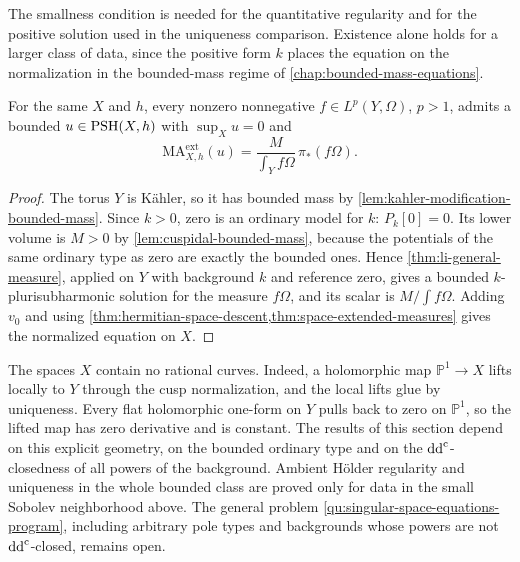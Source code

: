 The smallness condition is needed for the quantitative regularity and for the positive solution used in the uniqueness comparison. Existence alone holds for a larger class of data, since the positive form $k$ places the equation on the normalization in the bounded-mass regime of \cref{chap:bounded-mass-equations}.

\begin{corollary}\label{cor:cuspidal-lp-bounded-existence}
For the same $X$ and $h$, every nonzero nonnegative $f\in L^p(Y,\Omega)$, $p>1$, admits a bounded $u\in\mathrm{PSH}(X,h)$ with $\sup_Xu=0$ and
\[
 \mathrm{MA}^{\mathrm{ext}}_{X,h}(u)=\frac{M}{\int_Yf\Omega}\,\pi_*(f\Omega).
\]
\end{corollary}
\begin{proof}
The torus $Y$ is K\"ahler, so it has bounded mass by \cref{lem:kahler-modification-bounded-mass}. Since $k>0$, zero is an ordinary model for $k$: $P_k[0]=0$. Its lower volume is $M>0$ by \cref{lem:cuspidal-bounded-mass}, because the potentials of the same ordinary type as zero are exactly the bounded ones. Hence \cref{thm:li-general-measure}, applied on $Y$ with background $k$ and reference zero, gives a bounded $k$-plurisubharmonic solution for the measure $f\Omega$, and its scalar is $M/\int f\Omega$. Adding $v_0$ and using \cref{thm:hermitian-space-descent,thm:space-extended-measures} gives the normalized equation on $X$.
\end{proof}

The spaces $X$ contain no rational curves. Indeed, a holomorphic map $\mathbb P^1\to X$ lifts locally to $Y$ through the cusp normalization, and the local lifts glue by uniqueness. Every flat holomorphic one-form on $Y$ pulls back to zero on $\mathbb P^1$, so the lifted map has zero derivative and is constant. The results of this section depend on this explicit geometry, on the bounded ordinary type and on the $\mathrm{dd}^{\mathrm{c}}$-closedness of all powers of the background. Ambient H\"older regularity and uniqueness in the whole bounded class are proved only for data in the small Sobolev neighborhood above. The general problem \cref{qu:singular-space-equations-program}, including arbitrary pole types and backgrounds whose powers are not $\mathrm{dd}^{\mathrm{c}}$-closed, remains open.
